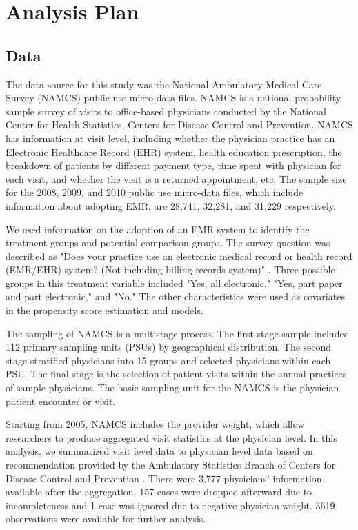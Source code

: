 \documentclass[12pt]{report}
\begin{document}
\chapter{Analysis Plan}
\label{chapter:analysisplan}
\section{Data}
The data source for this study was the National Ambulatory Medical Care Survey (NAMCS) public use micro-data files. NAMCS is a national probability sample survey of visits to office-based physicians conducted by the National Center for Health Statistics, Centers for Disease Control and Prevention. NAMCS has information at visit level, including whether the physician practice has an Electronic Healthcare Record (EHR) system, health education prescription, the breakdown of patients by different payment type, time spent with physician for each visit, and whether the visit is a returned appointment, etc. The sample size for the 2008, 2009, and 2010 public use micro-data files, which include information about adopting EMR, are 28,741, 32,281, and 31,229 respectively.

We used information on the adoption of an EMR system to identify the treatment groups and potential comparison groups. The survey question was described as "Does your practice use an electronic medical record or health record (EMR/EHR) system? (Not including billing records system)" \citep{NAMCSDOC2010}. Three possible groups in this treatment variable included "Yes, all electronic," "Yes, part paper and part electronic," and "No." The other characteristics were used as covariates in the propensity score estimation and models.

The sampling of NAMCS is a multistage process. The first-stage sample included 112 primary sampling units (PSUs) by geographical distribution. The second stage stratified physicians into 15 groups and selected physicians within each PSU. The final stage is the selection of patient visits within the annual practices of sample physicians. The basic sampling unit for the NAMCS is the physician-patient encounter or visit. 

Starting from 2005, NAMCS includes the provider weight, which allow researchers to produce aggregated visit statistics at the physician level. In this analysis, we summarized visit level data to physician level data based on recommendation provided by the Ambulatory Statistics Branch of Centers for Disease Control and Prevention \citep{SasProcedure}. There were 3,777 physicians' information available after the aggregation. 157 cases were dropped afterward due to incompleteness and 1 case was ignored due to negative physician weight. 3619 observations were available for further analysis. 
\end{document}
